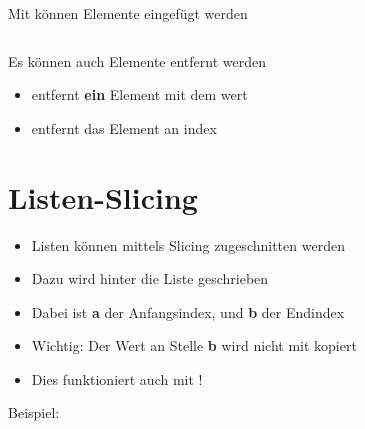 \begin{frame}
    \slidehead
    Mit  können Elemente eingefügt werden
    \pause
\end{frame}

\begin{frame}
    \slidehead
    \begin{columns}[T]
        \begin{column}[c]{0.5\textwidth}
        \end{column}
        \begin{column}[c]{0.5\textwidth}
        \end{column}
    \end{columns}
\end{frame}

\begin{frame}
    \slidehead
    Es können auch Elemente entfernt werden
    \begin{itemize}[<+->]
        \item {} entfernt \textbf{ein} Element mit dem wert 
        \item {} entfernt das Element an index 
    \end{itemize}
\end{frame}

\livecoding

\section{Listen-Slicing}
\begin{frame}
    \slidehead
    \begin{itemize}
        \item Listen können mittels Slicing zugeschnitten werden
            \pause
        \item Dazu wird  hinter die Liste geschrieben
        \item Dabei ist \textbf{a} der Anfangsindex, und \textbf{b} der Endindex
            \pause
        \item Wichtig: Der Wert an Stelle \textbf{b} wird nicht mit kopiert
        \item Dies funktioniert auch mit !
    \end{itemize}
    \pause

    \begin{block}{Beispiel:}
    \end{block}
\end{frame}

